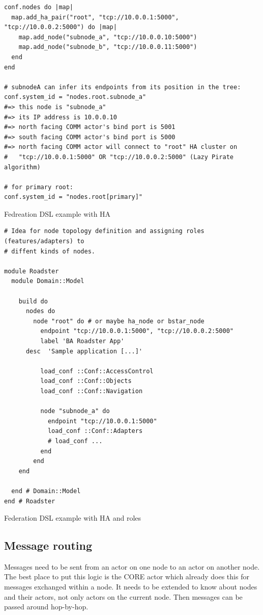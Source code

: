 \begin{listing}
	\begin{verbatim}
conf.nodes do |map|
  map.add_ha_pair("root", "tcp://10.0.0.1:5000", "tcp://10.0.0.2:5000") do |map|
    map.add_node("subnode_a", "tcp://10.0.0.10:5000")
    map.add_node("subnode_b", "tcp://10.0.0.11:5000")
  end
end

# subnodeA can infer its endpoints from its position in the tree:
conf.system_id = "nodes.root.subnode_a"
#=> this node is "subnode_a"
#=> its IP address is 10.0.0.10
#=> north facing COMM actor's bind port is 5001
#=> south facing COMM actor's bind port is 5000
#=> north facing COMM actor will connect to "root" HA cluster on
#   "tcp://10.0.0.1:5000" OR "tcp://10.0.0.2:5000" (Lazy Pirate algorithm)

# for primary root:
conf.system_id = "nodes.root[primary]"
	\end{verbatim}
	\caption{Fedreation DSL example with HA}
	\label{lst:dsl:topo:with-ha}
\end{listing}

\begin{listing}
	\begin{verbatim}
# Idea for node topology definition and assigning roles (features/adapters) to
# diffent kinds of nodes.

module Roadster
  module Domain::Model

    build do
      nodes do
        node "root" do # or maybe ha_node or bstar_node
          endpoint "tcp://10.0.0.1:5000", "tcp://10.0.0.2:5000"
          label 'BA Roadster App'
	  desc  'Sample application [...]'

          load_conf ::Conf::AccessControl
          load_conf ::Conf::Objects
          load_conf ::Conf::Navigation

          node "subnode_a" do
            endpoint "tcp://10.0.0.1:5000"
            load_conf ::Conf::Adapters
            # load_conf ...
          end
        end
    end

  end # Domain::Model
end # Roadster
	\end{verbatim}
	\caption{Federation DSL example with HA and roles}
	\label{lst:dsl:topo:with-roles}
\end{listing}


\subsection{Message routing}
Messages need to be sent from an actor on one node to an actor on another node.
The best place to put this logic is the CORE actor which already does this for
messages exchanged within a node. It needs to be extended to know about nodes
and their actors, not only actors on the current node. Then messages can be
passed around hop-by-hop.


